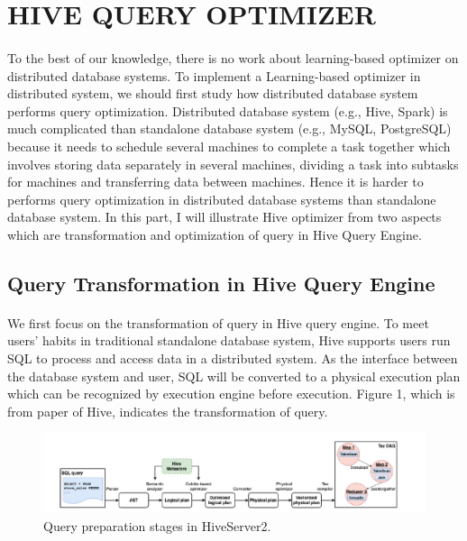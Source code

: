 \section{HIVE QUERY OPTIMIZER}
\label{hive-optimizer}
    \paragraph{}
    To the best of our knowledge, there is no work about learning-based optimizer on distributed database systems. To implement a Learning-based optimizer 
    in distributed system, we should first study how distributed database system performs query optimization. Distributed database
    system (e.g., Hive, Spark) is much complicated than standalone database system (e.g., MySQL, PostgreSQL) because it needs to schedule
    several machines to complete a task together which involves storing data separately in several machines, dividing a task into subtasks 
    for machines and transferring data between machines. Hence it is harder to performs query optimization in distributed database systems than standalone
    database system. In this part, I will illustrate Hive optimizer from two aspects which are transformation and optimization of query in Hive Query Engine.

    \subsection{Query Transformation in Hive Query Engine}
        \paragraph{}
        We first focus on the transformation of query in Hive query engine. To meet users' habits in traditional standalone 
        database system, Hive supports users run SQL to process and access data in a distributed system. As the interface 
        between the database system and user, SQL will be converted to a physical execution plan which can be recognized
        by execution engine before execution. Figure 1, which is from paper of Hive, indicates the transformation of query.
        \begin{figure}[htb]
            \centering
            \includegraphics[width=1\textwidth]{figures/hive_mloptimizer/query_transformation.png}
            \caption{Query preparation stages in HiveServer2\cite{Hive}.}
        \end{figure}
